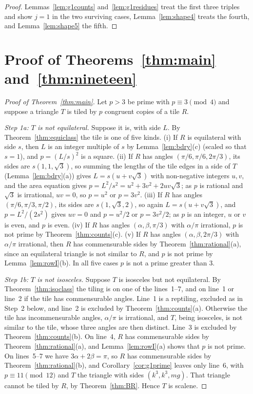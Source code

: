 \documentclass[11pt]{amsart}
\theoremstyle{remark}
\begin{document}
\begin{proof}
Lemmas~\ref{lem:g1counts} and~\ref{lem:g1residues} treat the first three triples and show $j=1$ in the two surviving cases, Lemma~\ref{lem:shape4} treats the fourth, and Lemma~\ref{lem:shape5} the fifth.
\end{proof}

\section{Proof of Theorems~\ref{thm:main} and~\ref{thm:nineteen}}\label{sec:proof}

\begin{proof}[Proof of Theorem~\ref{thm:main}]
Let $p>3$ be prime with $p\equiv 3\pmod 4$ and suppose a triangle $T$ is tiled by $p$ congruent copies of a tile $R$.

\emph{Step 1a: $T$ is not equilateral.} Suppose it is, with side $L$. By Theorem~\ref{thm:equiclass} the tile is one of five kinds. (i) If $R$ is equilateral with side $s$, then $L$ is an integer multiple of $s$ by Lemma~\ref{lem:bdry}(c) (scaled so that $s=1$), and $p=(L/s)^2$ is a square. (ii) If $R$ has angles $(\pi/6,\pi/6,2\pi/3)$, its sides are $s(1,1,\sqrt3)$, so summing the lengths of the tile edges in a side of $T$ (Lemma~\ref{lem:bdry}(a)) gives $L=s(u+v\sqrt3)$ with non-negative integers $u,v$, and the area equation gives $p=L^2/s^2=u^2+3v^2+2uv\sqrt3$; as $p$ is rational and $\sqrt3$ is irrational, $uv=0$, so $p=u^2$ or $p=3v^2$. (iii) If $R$ has angles $(\pi/6,\pi/3,\pi/2)$, its sides are $s(1,\sqrt3,2)$, so again $L=s(u+v\sqrt3)$, and $p=L^2/(2s^2)$ gives $uv=0$ and $p=u^2/2$ or $p=3v^2/2$; as $p$ is an integer, $u$ or $v$ is even, and $p$ is even. (iv) If $R$ has angles $(\alpha,\beta,\pi/3)$ with $\alpha/\pi$ irrational, $p$ is not prime by Theorem~\ref{thm:counts}(c). (v) If $R$ has angles $(\alpha,\beta,2\pi/3)$ with $\alpha/\pi$ irrational, then $R$ has commensurable sides by Theorem~\ref{thm:rational}(a), since an equilateral triangle is not similar to $R$, and $p$ is not prime by Lemma~\ref{lem:rowI}(b). In all five cases $p$ is not a prime greater than $3$.

\emph{Step 1b: $T$ is not isosceles.} Suppose $T$ is isosceles but not equilateral. By Theorem~\ref{thm:isoclass} the tiling is on one of the lines~1--7, and on line~1 or line~2 if the tile has commensurable angles. Line~1 is a reptiling, excluded as in Step~2 below, and line~2 is excluded by Theorem~\ref{thm:counts}(a). Otherwise the tile has incommensurable angles, $\alpha/\pi$ is irrational, and $T$, being isosceles, is not similar to the tile, whose three angles are then distinct. Line~3 is excluded by Theorem~\ref{thm:counts}(b). On line~4, $R$ has commensurable sides by Theorem~\ref{thm:rational}(a), and Lemma~\ref{lem:rowI}(a) shows that $p$ is not prime. On lines~5--7 we have $3\alpha+2\beta=\pi$, so $R$ has commensurable sides by Theorem~\ref{thm:rational}(b), and Corollary~\ref{cor:g1prime} leaves only line~6, with $p\equiv11\pmod{12}$ and $T$ the triangle with sides $(k^3,k^3,mg)$. That triangle cannot be tiled by $R$, by Theorem~\ref{thm:BR}. Hence $T$ is scalene.


\end{proof}
\end{document}
